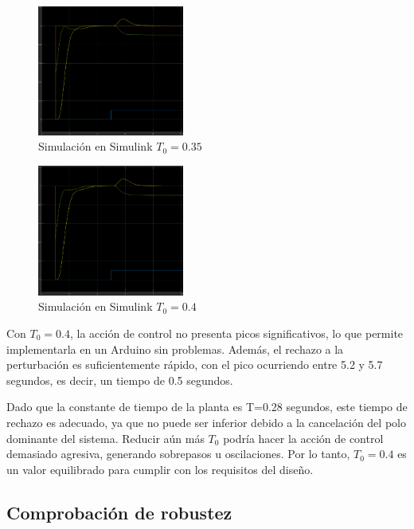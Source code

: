 \documentclass[letterpaper, 10 pt, conference]{ieeeconf}  %
\begin{document}
\begin{figure}[htpb]
  \centering
  \includegraphics[width=0.43\textwidth]{./IMAGENES/pid4.png}
  \caption{Simulación en Simulink \(T_{0} = 0.35\)}
  \label{fig:pid4}
\end{figure}

\begin{figure}[htpb]
  \centering
  \includegraphics[width=0.43\textwidth]{./IMAGENES/pid5.png}
  \caption{Simulación en Simulink \(T_{0} = 0.4\)}
  \label{fig:pid5}
\end{figure}

Con $T_{0}=0.4$, la acción de control no presenta picos significativos, lo que permite implementarla en un Arduino sin problemas. Además, el rechazo a la perturbación es suficientemente rápido, con el pico ocurriendo entre 5.2 y 5.7 segundos, es decir, un tiempo de 0.5 segundos.

Dado que la constante de tiempo de la planta es T=0.28 segundos, este tiempo de rechazo es adecuado, ya que no puede ser inferior debido a la cancelación del polo dominante del sistema. Reducir aún más $T_{0}$ podría hacer la acción de control demasiado agresiva, generando sobrepasos u oscilaciones. Por lo tanto, $T_{0}=0.4$ es un valor equilibrado para cumplir con los requisitos del diseño.

\subsection{Comprobación de robustez}
\end{document}
